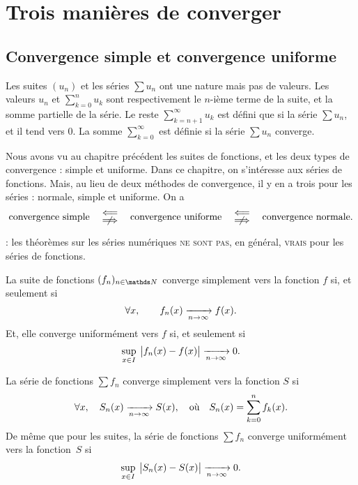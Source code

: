 \section{Trois manières de converger}
\subsection{Convergence simple et convergence uniforme}

\begin{rap}
	Les suites $(u_n)$\/ et les séries $\sum u_n$\/ ont une nature mais pas de valeurs. Les valeurs $u_n$\/ et $\sum_{k=0}^n u_k$\/ sont respectivement le $n$-ième terme de la suite, et la somme partielle de la série. Le reste $\sum_{k=n+1}^\infty u_k$\/ est défini que si la série $\sum u_n$, et il tend vers 0. La somme $\sum_{k=0}^{\infty}$\/ est définie si la série $\sum u_n$\/ converge.
\end{rap}

Nous avons vu au chapitre précédent les suites de fonctions, et les deux types de convergence : simple et uniforme. Dans ce chapitre, on s'intéresse aux séries de fonctions. Mais, au lieu de deux méthodes de convergence, il y en a trois pour les séries : normale, simple et uniforme. On a \[
	\text{convergence simple}\quad\substack{\\\ds\impliedby\\\ds\centernot{\implies}}\quad\text{convergence uniforme}\quad\substack{\\\ds\impliedby\\\ds\centernot{\implies}}\quad\text{convergence normale}.
\]

 : les théorèmes sur les séries numériques \textsc{ne sont pas}, en général, \textsc{vrais} pour les séries de fonctions.

\begin{rap}
	La suite de fonctions $(f_n)_{n\in\N}$\/ converge simplement vers la fonction $f$\/ si, et seulement si \[
		\forall x,\qquad f_n(x) \xrightarrow[n\to \infty]{} f(x)
	.\]
	Et, elle converge uniformément vers $f$\/ si, et seulement si \[
		\sup_{x \in I}\:\big|f_n(x) - f(x)\big| \xrightarrow[n\to \infty]{} 0
	.\]
\end{rap}

\begin{defn}
	La série de fonctions $\sum f_n$\/ converge simplement vers la fonction $S$\/ si \[
		\forall x,\quad S_n(x) \xrightarrow[n\to \infty]{} S(x),\quad \text{où}\quad S_n(x) = \sum_{k=0}^n f_k(x)
	.\]
	De même que pour les suites, la série de fonctions $\sum f_n$\/ converge uniformément vers la fonction~$S$\/ si \[
		\sup_{x \in I}\:\big|S_n(x) - S(x)\big| \xrightarrow[n\to \infty]{} 0
	.\]
\end{defn}

